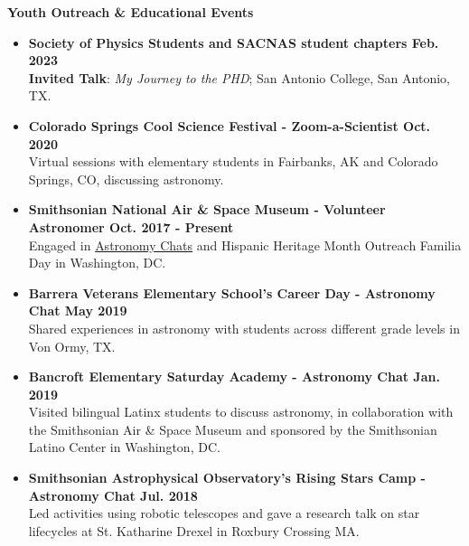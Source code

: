 \documentclass[letter,12pt]{article}
\begin{document}
\noindent
\vspace{-3mm}
{\bf Youth Outreach \& Educational Events} \\
\vspace{-10mm}
\begin{center}
\end{center}
\vspace{-3mm}
\begin{itemize}
    \item \textbf{Society of Physics Students and SACNAS student chapters \hfill Feb. 2023} \\
    \textbf{Invited Talk}: \textit{My Journey to the PHD}; San Antonio College, San Antonio, TX.
    \item \textbf{Colorado Springs Cool Science Festival - Zoom-a-Scientist \hfill Oct. 2020} \\
    Virtual sessions with elementary students in Fairbanks, AK and Colorado Springs, CO, discussing astronomy.
    \item \textbf{Smithsonian National Air \& Space Museum - Volunteer Astronomer \hfill Oct. 2017 - Present} \\
    Engaged in \href{https://airandspace.si.edu/events/astronomy-chat-gabriella-alvarez-and-laura-vega-0}{Astronomy Chats} and Hispanic Heritage Month Outreach Familia Day in Washington, DC.
    \item \textbf{Barrera Veterans Elementary School's Career Day - Astronomy Chat \hfill May 2019} \\
    Shared experiences in astronomy with students across different grade levels in Von Ormy, TX.
    \item \textbf{Bancroft Elementary Saturday Academy - Astronomy Chat \hfill Jan. 2019} \\
    Visited bilingual Latinx students to discuss astronomy, in collaboration with the Smithsonian Air \& Space Museum and sponsored by the Smithsonian Latino Center in Washington, DC.
    \item \textbf{Smithsonian Astrophysical Observatory's Rising Stars Camp - Astronomy Chat  \hfill Jul. 2018} \\
    Led activities using robotic telescopes and gave a research talk on star lifecycles at St. Katharine Drexel in Roxbury Crossing MA.
\end{itemize}
\end{document}
